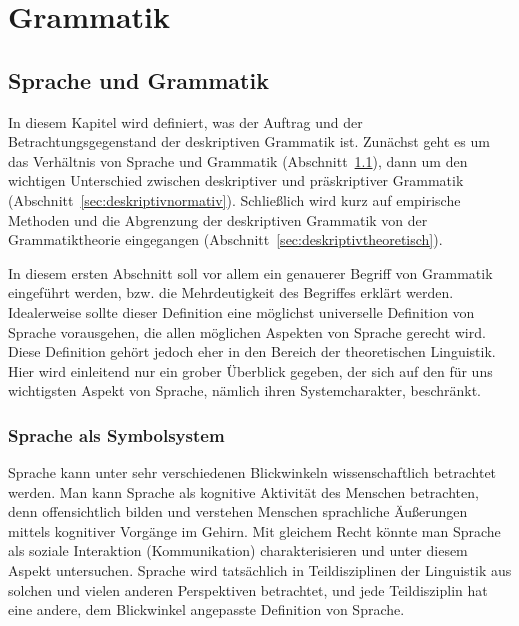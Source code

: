 \chapter{Grammatik}

\label{sec:grammatik}

\section{Sprache und Grammatik}

\label{sec:spracheundgrammatik}

In diesem Kapitel wird definiert, was der Auftrag und der Betrachtungsgegenstand der deskriptiven Grammatik ist.
Zunächst geht es um das Verhältnis von Sprache und Grammatik (Abschnitt~\ref{sec:spracheundgrammatik}), dann um den wichtigen Unterschied zwischen deskriptiver und präskriptiver Grammatik (Abschnitt~\ref{sec:deskriptivnormativ}).
Schließlich wird kurz auf empirische Methoden und die Abgrenzung der deskriptiven Grammatik von der Grammatiktheorie eingegangen (Abschnitt~\ref{sec:deskriptivtheoretisch}).

In diesem ersten Abschnitt soll vor allem ein genauerer Begriff von Grammatik eingeführt werden, bzw. die Mehrdeutigkeit des Begriffes erklärt werden.
Idealerweise sollte dieser Definition eine möglichst universelle Definition von Sprache vorausgehen, die allen möglichen Aspekten von Sprache gerecht wird.
Diese Definition gehört jedoch eher in den Bereich der theoretischen Linguistik.
Hier wird einleitend nur ein grober Überblick gegeben, der sich auf den für uns wichtigsten Aspekt von Sprache, nämlich ihren Systemcharakter, beschränkt.

\subsection{Sprache als Symbolsystem}

\label{sec:sprachsystem}


Sprache kann unter sehr verschiedenen Blickwinkeln wissenschaftlich betrachtet werden.
Man kann Sprache als kognitive Aktivität des Menschen betrachten, denn offensichtlich bilden und verstehen Menschen sprachliche Äußerungen mittels kognitiver Vorgänge im Gehirn.
Mit gleichem Recht könnte man Sprache als soziale Interaktion (Kommunikation) charakterisieren und unter diesem Aspekt untersuchen.
Sprache wird tatsächlich in Teildisziplinen der Linguistik aus solchen und vielen anderen Perspektiven betrachtet, und jede Teildisziplin hat eine andere, dem Blickwinkel angepasste Definition von Sprache.

